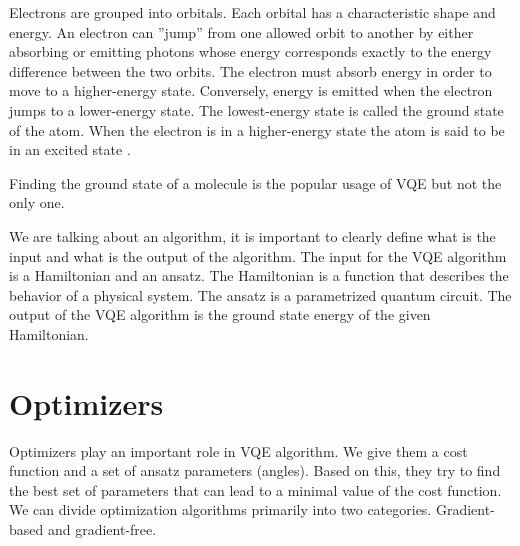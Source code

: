 Electrons are grouped into orbitals. Each orbital has a characteristic shape and energy. An electron can ''jump'' from one allowed orbit to another by either absorbing or emitting photons whose energy corresponds exactly to the energy difference between the two orbits. The electron must absorb energy in order to move to a higher-energy state. Conversely, energy is emitted when the electron jumps to a lower-energy state. The lowest-energy state is called the
ground state of the atom. When the electron is in a higher-energy state the atom is said to be in an excited state \cite{chemistry}.


Finding the ground state of a molecule is the popular usage of VQE but not the only one.


We are talking about an algorithm, it is important to clearly define what is the input and what is the output of the algorithm. The input for the VQE algorithm is a Hamiltonian and an ansatz. The Hamiltonian is a function that describes the behavior of a physical system. The ansatz is a parametrized quantum circuit. The output of the VQE algorithm is the ground state energy of the given Hamiltonian.


\section{Optimizers}
Optimizers play an important role in VQE algorithm. We give them a cost function and a set of ansatz parameters (angles). Based on this, they try to find the best set of parameters that can lead to a minimal value of the cost function. We can divide optimization algorithms primarily into two categories. Gradient-based and gradient-free.